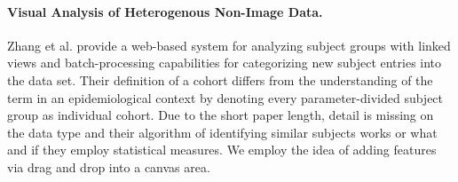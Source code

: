 \documentclass[journal]{style/vgtc} 			          %
\newcommand{\add}[1]{\textcolor{blue}{\uline{#1}}}
\begin{document}
\paragraph{Visual Analysis of Heterogenous Non-Image Data.}
Zhang et al. \cite{Zhang2012} provide a web-based system for analyzing subject groups with linked views and batch-processing capabilities for categorizing new subject entries into the data set.
%
Their definition of a cohort differs from the understanding of the term in an epidemiological context by denoting every parameter-divided subject group as individual cohort.
%
Due to the short paper length, detail is missing on the data type and their algorithm of identifying similar subjects works or what and if they employ statistical measures.
%
We employ the idea of adding features via drag and drop into a canvas area.
\end{document}

